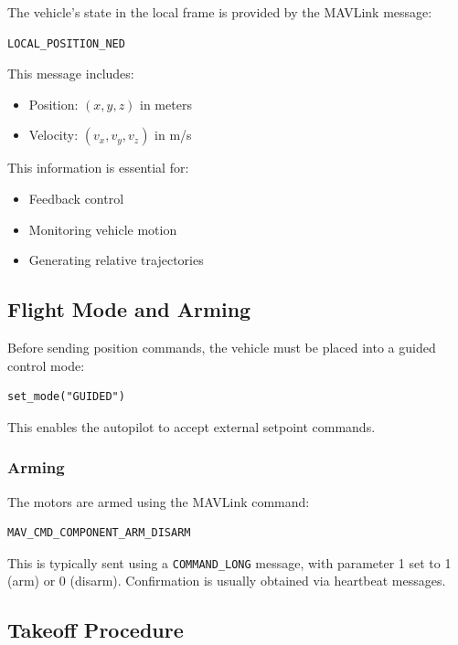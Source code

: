 The vehicle’s state in the local frame is provided by the MAVLink message:

\begin{verbatim}
LOCAL_POSITION_NED
\end{verbatim}

This message includes:
\begin{itemize}
    \item Position: $(x, y, z)$ in meters
    \item Velocity: $(v_x, v_y, v_z)$ in m/s
\end{itemize}

This information is essential for:
\begin{itemize}
    \item Feedback control
    \item Monitoring vehicle motion
    \item Generating relative trajectories
\end{itemize}

\subsection{Flight Mode and Arming}

Before sending position commands, the vehicle must be placed into a guided control mode:

\begin{verbatim}
set_mode("GUIDED")
\end{verbatim}

This enables the autopilot to accept external setpoint commands.

\subsubsection{Arming}

The motors are armed using the MAVLink command:

\begin{verbatim}
MAV_CMD_COMPONENT_ARM_DISARM
\end{verbatim}

This is typically sent using a \texttt{COMMAND\_LONG} message, with parameter 1 set to 1 (arm) or 0 (disarm). Confirmation is usually obtained via heartbeat messages.

\subsection{Takeoff Procedure}

